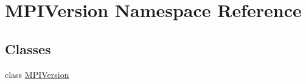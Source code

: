 \hypertarget{namespaceMPIVersion}{\section{M\-P\-I\-Version Namespace Reference}
\label{namespaceMPIVersion}
}
\subsection*{Classes}
\begin{DoxyCompactItemize}
\item 
class \hyperlink{classMPIVersion_1_1MPIVersion}{M\-P\-I\-Version}
\end{DoxyCompactItemize}
